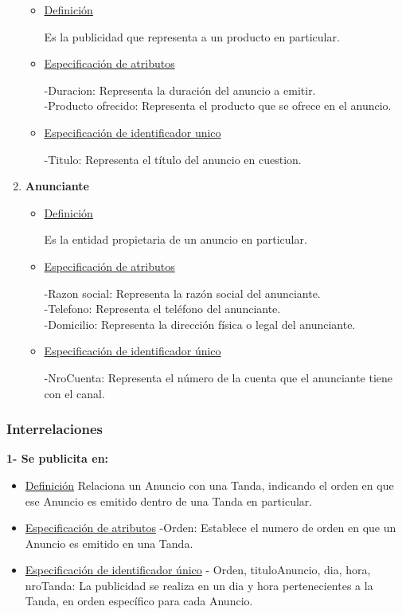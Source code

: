 \documentclass[a4paper,10pt,titlepage]{article}
\begin{document}
\begin{enumerate}
\begin{itemize}

\item \underline{Definici\'on}

Es la publicidad que representa a un producto en particular.

\item \underline{Especificaci\'on de atributos}

-Duracion: Representa la duraci\'on del anuncio a emitir.\\
-Producto ofrecido: Representa el producto que se ofrece en el anuncio.

\item \underline{Especificaci\'on de identificador unico}

-Titulo: Representa el t\'itulo del anuncio en cuestion.

\end{itemize}


\item {\bf Anunciante}

\begin{itemize}

\item \underline{Definici\'on}

Es la entidad propietaria de un anuncio en particular. 

\item \underline{Especificaci\'on de atributos}

-Razon social: Representa la raz\'on social del anunciante.\\
-Telefono: Representa el tel\'efono del anunciante.\\
-Domicilio: Representa la direcci\'on f\'isica o legal del anunciante.\\

\item \underline{Especificaci\'on de identificador \'unico}

-NroCuenta: Representa el n\'umero de la cuenta que el anunciante tiene con el canal.

\end{itemize}
\end{enumerate}

\subsubsection{Interrelaciones}

\textbf{1- Se publicita en:}
\begin{itemize}
\item \underline{Definici\'on}
Relaciona un Anuncio con una Tanda, indicando el orden en que ese Anuncio es emitido dentro de una Tanda en particular.
\item \underline{Especificaci\'on de atributos}
-Orden: Establece el numero de orden en que un Anuncio es emitido en una Tanda. 
\item \underline{Especificaci\'on de identificador \'unico}
- Orden, tituloAnuncio, dia, hora, nroTanda: La publicidad se realiza en un dia y hora pertenecientes a la Tanda, en orden espec\'ifico para cada Anuncio.
\end{itemize}
\end{document}
